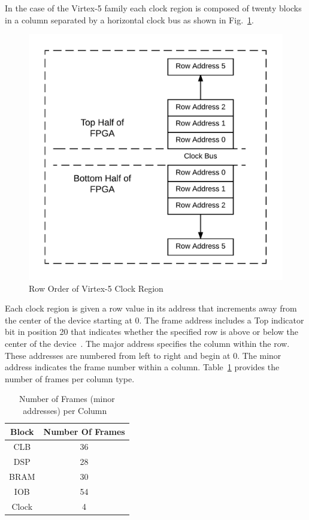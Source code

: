 \documentclass[journal, hidelinks]{IEEEtran}
\begin{document}
In the case of the Virtex-5 family each clock region is composed of twenty blocks in a column separated by a horizontal clock bus as shown in Fig.~\ref{fig:RowOrder}.
\begin{figure}[]
	\centering
	\includegraphics[width=1\linewidth]{Figures/RowOrder}
	\caption[Row Order of Virtex-5 Clock Region]{Row Order of Virtex-5 Clock Region}
	\label{fig:RowOrder}
\end{figure}
Each clock region is given a row value in its address that increments away from the center of the device starting at 0. 
The frame address includes a Top indicator bit in position 20 that indicates whether the specified row is above or below the center of the device~\cite{virtex5ConfigGuide}.
The major address specifies the column within the row.
These addresses are numbered from left to right and begin at 0.
The minor address indicates the frame number within a column. 
Table~\ref{tbl:minorAddressNumbers} provides the number of frames per column type.
\begin{table}[h]
	\centering
	\caption{Number of Frames (minor addresses) per Column~\cite{virtex5ConfigGuide}}
	\label{tbl:minorAddressNumbers}
	\begin{tabular}{|c|c|}
		\hline
		Block             & Number Of Frames \\ \hline
		CLB               & 36               \\ \hline
		DSP               & 28               \\ \hline
		BRAM   & 30               \\ \hline
		IOB               & 54               \\ \hline
		Clock             & 4                \\ \hline
	\end{tabular}
\end{table}
\end{document}
